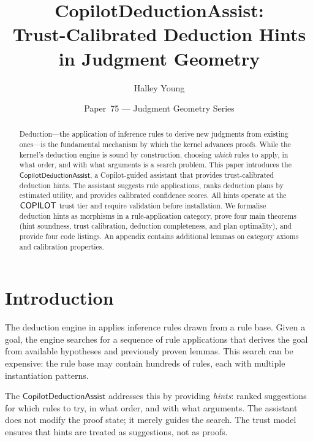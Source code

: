 \documentclass[11pt]{article}
\title{\textbf{CopilotDeductionAssist:\\
Trust-Calibrated Deduction Hints in Judgment Geometry}}
\author{Halley Young}
\date{Paper~75 --- Judgment Geometry Series}
\newcommand{\CDA}{\mathsf{CopilotDeductionAssist}}
\begin{document}
\maketitle

\begin{abstract}
Deduction---the application of inference rules to derive new
judgments from existing ones---is the fundamental mechanism by
which the \JuGeo{} kernel advances proofs.  While the kernel's
deduction engine is sound by construction, choosing \emph{which}
rules to apply, in what order, and with what arguments is a
search problem.  This paper introduces the $\CDA$, a Copilot-guided
assistant that provides trust-calibrated deduction hints.  The
assistant suggests rule applications, ranks deduction plans by
estimated utility, and provides calibrated confidence scores.
All hints operate at the $\mathsf{COPILOT}$ trust tier and require
validation before installation.  We formalise deduction hints
as morphisms in a rule-application category, prove four main
theorems (hint soundness, trust calibration, deduction
completeness, and plan optimality), and provide four \Python{}
code listings.  An appendix contains additional lemmas on
category axioms and calibration properties.
\end{abstract}

\section{Introduction}\label{sec:intro}

The deduction engine in \JuGeo{} applies inference rules
drawn from a rule base.  Given a goal, the engine searches
for a sequence of rule applications that derives the goal
from available hypotheses and previously proven lemmas.
This search can be expensive: the rule base may contain
hundreds of rules, each with multiple instantiation patterns.

The $\CDA$ addresses this by providing \emph{hints}:
ranked suggestions for which rules to try, in what order,
and with what arguments.  The assistant does not modify
the proof state; it merely guides the search.  The trust
model ensures that hints are treated as suggestions, not
as proofs.
\end{document}
